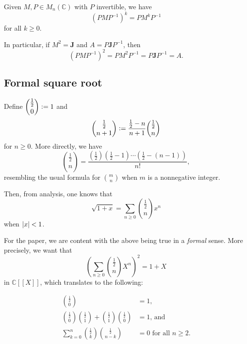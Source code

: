 \documentclass[12pt]{article}
\begin{document}
\begin{obs} 
	Given $M, P \in M_{n}(\mathbb{C})$ with $P$ invertible, we have
	\begin{equation*} 
		(P M P^{-1})^{k} = P M^{k} P^{-1}
	\end{equation*}
	for all $k \ge 0$.

	In particular, if $M^{2} = \mathbf{J}$ and $A = P\mathbf{J}P^{-1}$, then
	\begin{equation*} 
		(PMP^{-1})^{2} = PM^{2}P^{-1} = P\mathbf{J}P^{-1} = A.
	\end{equation*}
\end{obs}

\subsection{Formal square root}

Define $\dbinom{\frac{1}{2}}{0} \vcentcolon= 1$ and
\begin{equation*} 
	\binom{\frac{1}{2}}{n + 1} \vcentcolon= \frac{\frac{1}{2} - n}{n + 1}\binom{\frac{1}{2}}{n}
\end{equation*}
for $n \ge 0$. More directly, we have 
\begin{equation*} 
	\binom{\frac{1}{2}}{n} = \frac{\left(\frac{1}{2}\right)\left(\frac{1}{2} - 1\right) \cdots \left(\frac{1}{2} - (n - 1)\right)}{n!},
\end{equation*}
resembling the usual formula for $\binom{m}{n}$ when $m$ is a nonnegative integer. 

Then, from analysis, one knows that 
\begin{equation*} 
	\sqrt{1 + x} = \sum_{n \ge 0} \binom{\frac{1}{2}}{n} x^{n}
\end{equation*}
when ${\left\lvert x \right\lvert} < 1$. 

For the paper, we are content with the above being true in a \emph{formal} sense. More precisely, we want that
\begin{equation*} 
	\left(\sum_{n \ge 0} \binom{\frac{1}{2}}{n} X^{n}\right)^{2} = 1 + X
\end{equation*}
in $\mathbb{C}[\![X]\!]$, which translates to the following:
\begin{prop} \label{prop:formal-square-root}
	\begin{align*} 
		\binom{\frac{1}{2}}{0} &= 1,\\
		\binom{\frac{1}{2}}{0}\binom{\frac{1}{2}}{1} + \binom{\frac{1}{2}}{1}\binom{\frac{1}{2}}{0} &= 1,\,\text{and} \\
		\sum_{k = 0}^{n} \binom{\frac{1}{2}}{k} \binom{\frac{1}{2}}{n - k} &= 0 \text{ for all $n \ge 2$.}
	\end{align*}
\end{prop}
\end{document}

